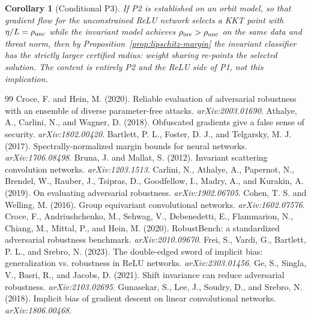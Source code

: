 \documentclass[11pt]{article}
\theoremstyle{plain}
\newtheorem{corollary}{Corollary}
\theoremstyle{definition}
\theoremstyle{remark}
\begin{document}
\begin{corollary}[Conditional P3]\label{cor:conditional-p3}
If P2 is established on an orbit model, so that gradient flow for the unconstrained ReLU network selects a KKT point with $\eta/L=\rho_{\rm unc}$ while the invariant model achieves $\rho_{\rm inv}>\rho_{\rm unc}$ on the same data and threat norm, then by Proposition~\ref{prop:lipschitz-margin} the invariant classifier has the strictly larger certified radius: weight sharing re-points the selected solution.  The content is entirely P2 and the ReLU side of P1, not this implication.
\end{corollary}

\begin{thebibliography}{99}
 Croce, F. and Hein, M. (2020). Reliable evaluation of adversarial robustness with an ensemble of diverse parameter-free attacks. \emph{arXiv:2003.01690}.
 Athalye, A., Carlini, N., and Wagner, D. (2018). Obfuscated gradients give a false sense of security. \emph{arXiv:1802.00420}.
 Bartlett, P. L., Foster, D. J., and Telgarsky, M. J. (2017). Spectrally-normalized margin bounds for neural networks. \emph{arXiv:1706.08498}.
 Bruna, J. and Mallat, S. (2012). Invariant scattering convolution networks. \emph{arXiv:1203.1513}.
 Carlini, N., Athalye, A., Papernot, N., Brendel, W., Rauber, J., Tsipras, D., Goodfellow, I., Madry, A., and Kurakin, A. (2019). On evaluating adversarial robustness. \emph{arXiv:1902.06705}.
 Cohen, T. S. and Welling, M. (2016). Group equivariant convolutional networks. \emph{arXiv:1602.07576}.
 Croce, F., Andriushchenko, M., Sehwag, V., Debenedetti, E., Flammarion, N., Chiang, M., Mittal, P., and Hein, M. (2020). RobustBench: a standardized adversarial robustness benchmark. \emph{arXiv:2010.09670}.
 Frei, S., Vardi, G., Bartlett, P. L., and Srebro, N. (2023). The double-edged sword of implicit bias: generalization vs. robustness in ReLU networks. \emph{arXiv:2303.01456}.
 Ge, S., Singla, V., Basri, R., and Jacobs, D. (2021). Shift invariance can reduce adversarial robustness. \emph{arXiv:2103.02695}.
 Gunasekar, S., Lee, J., Soudry, D., and Srebro, N. (2018). Implicit bias of gradient descent on linear convolutional networks. \emph{arXiv:1806.00468}.

\end{thebibliography}
\end{document}

